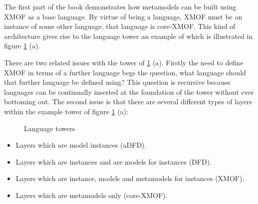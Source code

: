 The first part of the book demonstrates how metamodels can be built using XMOF as a base language.  By virtue of being a language, XMOF must be an instance of some other language, that language is core-XMOF.  This kind of architecture gives rise to the language tower an example of which is illustrated in figure \ref{tower} (a).

There are two related issues with the tower of \ref{tower} (a).  Firstly the need to define XMOF in terms of a further language begs the question, what language should that further language be defined using?  This question is recursive because languages can be continually inserted at the foundation of the tower without ever bottoming out.  The second issue is that there are several different types of layers within the example tower of figure \ref{tower} (a):

\begin{figure}[htb]
\begin{center}
\caption{Language towers}
\label{tower}
\end{center}
\end{figure}

\begin{itemize}
\item Layers which are model instances (aDFD).
\item Layers which are instances and are models for instances (DFD).
\item Layers which are instance, models and metamodels for instances (XMOF).
\item Layers which are metamodels only (core-XMOF).
\end{itemize}


